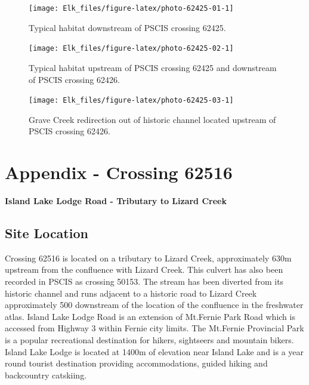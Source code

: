 \documentclass[
]{book}
\begin{document}
\begin{figure}[!ht]
\texttt{[image: Elk\_files/figure-latex/photo-62425-01-1]} \caption{Typical habitat downstream of PSCIS crossing 62425.}\label{fig:photo-62425-01}
\end{figure}

\begin{figure}[!ht]
\texttt{[image: Elk\_files/figure-latex/photo-62425-02-1]} \caption{Typical habitat upstream of PSCIS crossing 62425 and downstream of PSCIS crossing 62426.}\label{fig:photo-62425-02}
\end{figure}

\begin{figure}[!ht]
\texttt{[image: Elk\_files/figure-latex/photo-62425-03-1]} \caption{Grave Creek redirection out of historic channel located upstream of PSCIS crossing 62426.}\label{fig:photo-62425-03}
\end{figure}

\hypertarget{appendix---crossing-62516}{%
\chapter*{Appendix - Crossing 62516}\label{appendix---crossing-62516}}

\textbf{Island Lake Lodge Road - Tributary to Lizard Creek}

\hypertarget{site-location-5}{%
\section*{Site Location}\label{site-location-5}}

Crossing 62516 is located on a tributary to Lizard Creek, approximately 630m upstream from the confluence with Lizard Creek. This culvert has also been recorded in PSCIS as crossing 50153. The stream has been diverted from its historic channel and runs adjacent to a historic road to Lizard Creek approximately 500 downstream of the location of the confluence in the freshwater atlas. Island Lake Lodge Road is an extension of Mt.Fernie Park Road which is accessed from Highway 3 within Fernie city limits. The Mt.Fernie Provincial Park is a popular recreational destination for hikers, sightseers and mountain bikers. Island Lake Lodge is located at 1400m of elevation near Island Lake and is a year round tourist destination providing accommodations, guided hiking and backcountry catskiing.
\end{document}
